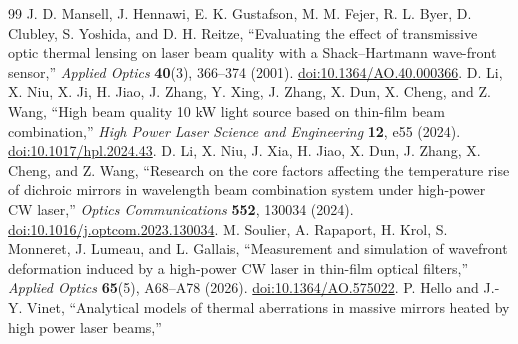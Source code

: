\begin{thebibliography}{99}
J. D. Mansell, J. Hennawi, E. K. Gustafson, M. M. Fejer, R. L. Byer, D. Clubley, S. Yoshida, and D. H. Reitze,
``Evaluating the effect of transmissive optic thermal lensing on laser beam quality with a Shack--Hartmann wave-front sensor,''
\emph{Applied Optics} \textbf{40}(3), 366--374 (2001).
\href{https://doi.org/10.1364/AO.40.000366}{doi:10.1364/AO.40.000366}.
D. Li, X. Niu, X. Ji, H. Jiao, J. Zhang, Y. Xing, J. Zhang, X. Dun, X. Cheng, and Z. Wang,
``High beam quality 10 kW light source based on thin-film beam combination,''
\emph{High Power Laser Science and Engineering} \textbf{12}, e55 (2024).
\href{https://doi.org/10.1017/hpl.2024.43}{doi:10.1017/hpl.2024.43}.
D. Li, X. Niu, J. Xia, H. Jiao, X. Dun, J. Zhang, X. Cheng, and Z. Wang,
``Research on the core factors affecting the temperature rise of dichroic mirrors in wavelength beam combination system under high-power CW laser,''
\emph{Optics Communications} \textbf{552}, 130034 (2024).
\href{https://doi.org/10.1016/j.optcom.2023.130034}{doi:10.1016/j.optcom.2023.130034}.
M. Soulier, A. Rapaport, H. Krol, S. Monneret, J. Lumeau, and L. Gallais,
``Measurement and simulation of wavefront deformation induced by a high-power CW laser in thin-film optical filters,''
\emph{Applied Optics} \textbf{65}(5), A68--A78 (2026).
\href{https://doi.org/10.1364/AO.575022}{doi:10.1364/AO.575022}.
P. Hello and J.-Y. Vinet,
``Analytical models of thermal aberrations in massive mirrors heated by high power laser beams,''

\end{thebibliography}
